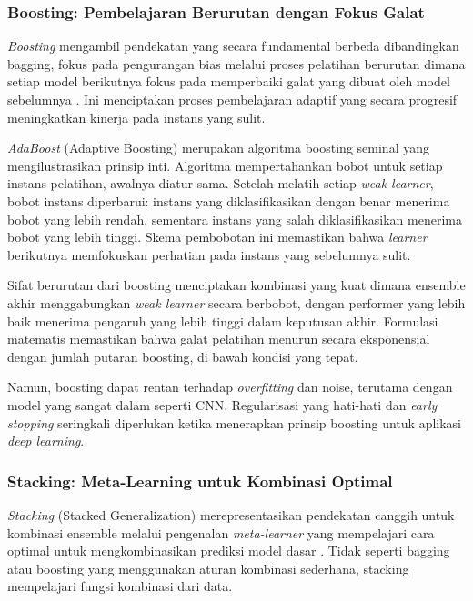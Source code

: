 \subsubsection{Boosting: Pembelajaran Berurutan dengan Fokus Galat}

\textit{Boosting} mengambil pendekatan yang secara fundamental berbeda dibandingkan bagging, fokus pada pengurangan bias melalui proses pelatihan berurutan dimana setiap model berikutnya fokus pada memperbaiki galat yang dibuat oleh model sebelumnya \cite{freund1997decision}. Ini menciptakan proses pembelajaran adaptif yang secara progresif meningkatkan kinerja pada instans yang sulit.

\textit{AdaBoost} (Adaptive Boosting) merupakan algoritma boosting seminal yang mengilustrasikan prinsip inti. Algoritma mempertahankan bobot untuk setiap instans pelatihan, awalnya diatur sama. Setelah melatih setiap \textit{weak learner}, bobot instans diperbarui: instans yang diklasifikasikan dengan benar menerima bobot yang lebih rendah, sementara instans yang salah diklasifikasikan menerima bobot yang lebih tinggi. Skema pembobotan ini memastikan bahwa \textit{learner} berikutnya memfokuskan perhatian pada instans yang sebelumnya sulit.

Sifat berurutan dari boosting menciptakan kombinasi yang kuat dimana ensemble akhir menggabungkan \textit{weak learner} secara berbobot, dengan performer yang lebih baik menerima pengaruh yang lebih tinggi dalam keputusan akhir. Formulasi matematis memastikan bahwa galat pelatihan menurun secara eksponensial dengan jumlah putaran boosting, di bawah kondisi yang tepat.

Namun, boosting dapat rentan terhadap \textit{overfitting} dan noise, terutama dengan model yang sangat dalam seperti CNN. Regularisasi yang hati-hati dan \textit{early stopping} seringkali diperlukan ketika menerapkan prinsip boosting untuk aplikasi \textit{deep learning}.

\subsubsection{Stacking: Meta-Learning untuk Kombinasi Optimal}

\textit{Stacking} (Stacked Generalization) merepresentasikan pendekatan canggih untuk kombinasi ensemble melalui pengenalan \textit{meta-learner} yang mempelajari cara optimal untuk mengkombinasikan prediksi model dasar \cite{wolpert1992stacked}. Tidak seperti bagging atau boosting yang menggunakan aturan kombinasi sederhana, stacking mempelajari fungsi kombinasi dari data.

